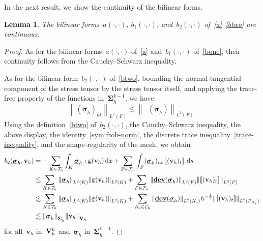 \documentclass[a4paper,twoside,10pt]{article}
\theoremstyle{plain}
\newtheorem{lemma}[theorem]{Lemma}
\theoremstyle{remark}
\theoremstyle{definition}
\numberwithin{equation}{section}
\numberwithin{figure}{section}
\newcommand{\Norm}[1]{{\left\|{#1} \right\|}}
\newcommand{\jump}[1]{\left[\!\left[#1\right]\!\right]}
\newcommand{\Ccalh}{\mathcal{C}_h}
\newcommand{\Tauh}{\mathcal{T}_h}
\newcommand{\K}{K}
\newcommand{\F}{F}
\newcommand{\Sigmah}{\underline{\boldsymbol{\Sigma}}_h}
\newcommand{\Sigmahkmo}{\Sigmah^{k-1}}
\newcommand{\Vh}{{\bf{V}}_h}
\newcommand{\Vhk}{\Vh^k}
\newcommand{\vbfh}{\mathbf{v}_h}
\newcommand{\sigmabfh}{\underline{\boldsymbol{\sigma}}_h}
\DeclareMathOperator{\dev}{\underline{\mathbf{dev}}}
\newcommand{\normtang}{{nt}}
\newcommand{\tangscalar}{t}
\newcommand{\Ltwo}{L^2}
\newcommand{\Fcalh}{\mathcal{F}_h}
\newcommand{\dx}{\, \mathrm{d}x}
\newcommand{\ds}{\, \mathrm{d}s}
\newcommand{\bone}{b_1}
\newcommand{\btwo}{b_2}
\newcommand{\epsbfun}{\underline{\boldsymbol{\varepsilon}}}
\newcommand{\Ki}{{\K_i}}
\newcommand{\Fi}{{\F_{\Ki}}}
\begin{document}
In the next result,
we show the continuity of the bilinear forms.
\begin{lemma} \label{lemma:continuity}
The bilinear forms~$a(\cdot,\cdot)$, $\bone(\cdot,\cdot)$, and~$\btwo(\cdot,\cdot)$
of~\eqref{a}--\eqref{btwo} 
are continuous.
\end{lemma}
\begin{proof}
As for the bilinear forms~$a(\cdot,\cdot)$ of~\eqref{a} and~$\bone(\cdot,\cdot)$ of~\eqref{bone},
their continuity follows from the Cauchy--Schwarz inequality.

As for the bilinear form~$\btwo(\cdot,\cdot)$ of~\eqref{btwo},
bounding the normal-tangential component of the stress tensor by the stress tensor itself,
and applying
the trace-free property of the functions in~$\Sigmahkmo$,
we have
\begin{equation*}
\Norm{(\sigmabfh)_{\normtang}}_{\Ltwo(\F)}
\lesssim \Norm{\dev(\sigmabfh)}_{\Ltwo(\F)}.
\end{equation*}
Using the definition~\eqref{btwo} of~$\btwo(\cdot,\cdot)$,
the Cauchy--Schwarz inequality,
the above display,
the identity~\eqref{sym:frob-norm},
the discrete trace inequality~\eqref{trace-inequality},
and the shape-regularity of the mesh,
we obtain
\begin{equation*}
\begin{split}
\btwo(\sigmabfh,\vbfh)
&= - \sum_{\K \in \Tauh} \int_{\K} \sigmabfh : \epsbfun(\vbfh) \dx
    + \sum_{\F \in \Fcalh} \int_{\F} (\sigmabfh)_{\normtang} \jump{(\vbfh)_{\tangscalar}} \ds \\
&\lesssim \sum_{\K \in \Tauh} \Norm{\sigmabfh}_{\Ltwo(\K)} \Norm{\epsbfun(\vbfh)}_{\Ltwo(\K)}
    + \sum_{\F \in \Fcalh} \Norm{\dev(\sigmabfh)}_{\Ltwo(\F)} \Norm{\jump{(\vbfh)_{\tangscalar}}}_{\Ltwo(\F)} \\
&\lesssim  \sum_{\K \in \Tauh} \Norm{\sigmabfh}_{\Ltwo(\K)} \Norm{\epsbfun(\vbfh)}_{\Ltwo(\K)}
    + \sum_{\Ki \in \Ccalh} \Norm{\dev(\sigmabfh)}_{\Ltwo(\Ki)} h^{-\frac12} \Norm{\jump{(\vbfh)_{\tangscalar}}}_{\Ltwo(\Fi)} \\
&\lesssim \Norm{\sigmabfh}_{\Sigmah} \Norm{\vbfh}_{\Vh}
\end{split}
\end{equation*}
for all~$\vbfh$ in~$\Vhk$ and~$\sigmabfh$ in~$\Sigmahkmo$.
\end{proof}
\end{document}
